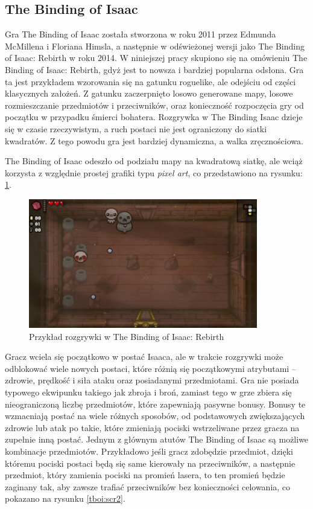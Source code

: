 \documentclass[12pt,twoside]{article}
\begin{document}
\subsection{The Binding of Isaac}

Gra The Binding of Isaac została stworzona w roku 2011 przez Edmunda McMillena i Floriana Himsla, a następnie w odświeżonej wersji jako The Binding of Isaac: Rebirth w roku 2014. W niniejszej pracy skupiono się na omówieniu The Binding of Isaac: Rebirth, gdyż jest to nowsza i bardziej popularna odsłona. Gra ta jest przykładem wzorowania się na gatunku roguelike, ale odejściu od części klasycznych założeń. Z gatunku zaczerpnięto losowo generowane mapy, losowe rozmieszczanie przedmiotów i przeciwników, oraz konieczność rozpoczęcia gry od początku w przypadku śmierci bohatera. Rozgrywka w The Binding Isaac dzieje się w czasie rzeczywistym, a ruch postaci nie jest ograniczony do siatki kwadratów. Z tego powodu gra jest bardziej dynamiczna, a walka zręcznościowa.

The Binding of Isaac odeszło od podziału mapy na kwadratową siatkę, ale wciąż korzysta z względnie prostej grafiki typu \emph{pixel art}, co przedstawiono na rysunku: \ref{tboi:scr1}.

\FloatBarrier
\begin{figure}[ht]
	\centering
	\includegraphics[width=10cm]{images/tboi/scr1.png}
	\caption{Przykład rozgrywki w The Binding of Isaac: Rebirth}
	\label{tboi:scr1}
\end{figure}
\FloatBarrier

Gracz wciela się początkowo w postać Isaaca, ale w trakcie rozgrywki może odblokować wiele nowych postaci, które różnią się początkowymi atrybutami -- zdrowie, prędkość i siła ataku oraz posiadanymi przedmiotami. Gra nie posiada typowego ekwipunku takiego jak zbroja i broń, zamiast tego w grze zbiera się nieograniczoną liczbę przedmiotów, które zapewniają pasywne bonusy. Bonusy te wzmacniają postać na wiele różnych sposobów, od podstawowych zwiększających zdrowie lub atak po takie, które zmieniają pociski wstrzeliwane przez gracza na zupełnie inną postać. Jednym z głównym atutów The Binding of Isaac są możliwe kombinacje przedmiotów. Przykładowo jeśli gracz zdobędzie przedmiot, dzięki któremu pociski postaci będą się same kierowały na przeciwników, a następnie przedmiot, który zamienia pociski na promień lasera, to ten promień będzie zaginany tak, aby zawsze trafiać przeciwników bez konieczności celowania, co pokazano na rysunku \ref{tboi:scr2}.
\end{document}
